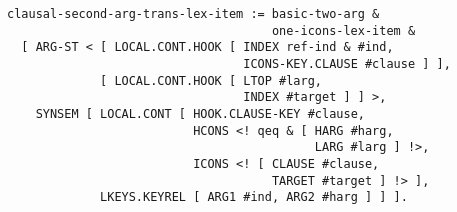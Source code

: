 \documentclass[a4paper]{article}
\begin{document}
{\small\begin{verbatim}
clausal-second-arg-trans-lex-item := basic-two-arg & 
                                     one-icons-lex-item &
  [ ARG-ST < [ LOCAL.CONT.HOOK [ INDEX ref-ind & #ind,
                                 ICONS-KEY.CLAUSE #clause ] ],
             [ LOCAL.CONT.HOOK [ LTOP #larg, 
                                 INDEX #target ] ] >,
    SYNSEM [ LOCAL.CONT [ HOOK.CLAUSE-KEY #clause,
                          HCONS <! qeq & [ HARG #harg, 
                                           LARG #larg ] !>,
                          ICONS <! [ CLAUSE #clause, 
                                     TARGET #target ] !> ],
             LKEYS.KEYREL [ ARG1 #ind, ARG2 #harg ] ] ].
\end{verbatim}}
\end{document}
